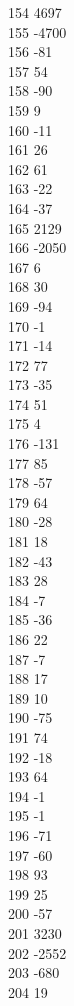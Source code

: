 { 154	4697 \\
 155	-4700 \\
 156	-81 \\
 157	54 \\
 158	-90 \\
 159	9 \\
 160	-11 \\
 161	26 \\
 162	61 \\
 163	-22 \\
 164	-37 \\
 165	2129 \\
 166	-2050 \\
 167	6 \\
 168	30 \\
 169	-94 \\
 170	-1 \\
 171	-14 \\
 172	77 \\
 173	-35 \\
 174	51 \\
 175	4 \\
 176	-131 \\
 177	85 \\
 178	-57 \\
 179	64 \\
 180	-28 \\
 181	18 \\
 182	-43 \\
 183	28 \\
 184	-7 \\
 185	-36 \\
 186	22 \\
 187	-7 \\
 188	17 \\
 189	10 \\
 190	-75 \\
 191	74 \\
 192	-18 \\
 193	64 \\
 194	-1 \\
 195	-1 \\
 196	-71 \\
 197	-60 \\
 198	93 \\
 199	25 \\
 200	-57 \\
 201	3230 \\
 202	-2552 \\
 203	-680 \\
 204	19 \\
}
